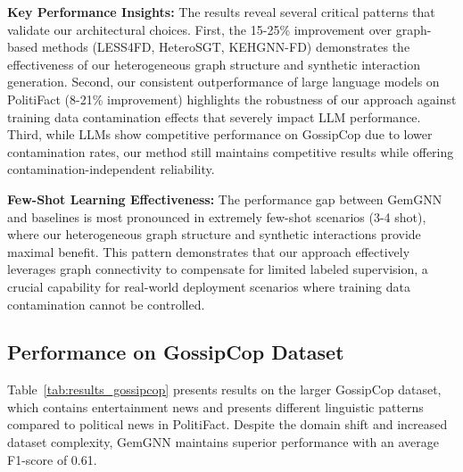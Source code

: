 \textbf{Key Performance Insights:} The results reveal several critical patterns that validate our architectural choices. First, the 15-25\% improvement over graph-based methods (LESS4FD, HeteroSGT, KEHGNN-FD) demonstrates the effectiveness of our heterogeneous graph structure and synthetic interaction generation. Second, our consistent outperformance of large language models on PolitiFact (8-21\% improvement) highlights the robustness of our approach against training data contamination effects that severely impact LLM performance. Third, while LLMs show competitive performance on GossipCop due to lower contamination rates, our method still maintains competitive results while offering contamination-independent reliability.

\textbf{Few-Shot Learning Effectiveness:} The performance gap between GemGNN and baselines is most pronounced in extremely few-shot scenarios (3-4 shot), where our heterogeneous graph structure and synthetic interactions provide maximal benefit. This pattern demonstrates that our approach effectively leverages graph connectivity to compensate for limited labeled supervision, a crucial capability for real-world deployment scenarios where training data contamination cannot be controlled.

\subsection{Performance on GossipCop Dataset}

Table~\ref{tab:results_gossipcop} presents results on the larger GossipCop dataset, which contains entertainment news and presents different linguistic patterns compared to political news in PolitiFact. Despite the domain shift and increased dataset complexity, GemGNN maintains superior performance with an average F1-score of 0.61.

